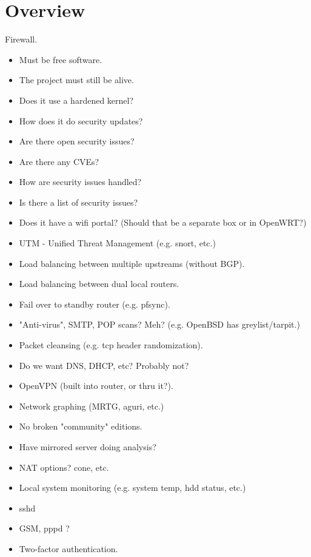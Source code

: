 %
%
%
%
%

\section{Overview}
Firewall.

\begin{itemize}
 \item Must be free software.
 \item The project must still be alive.
 \item Does it use a hardened kernel?
 \item How does it do security updates?
 \item Are there open security issues?
 \item Are there any CVEs?
 \item How are security issues handled?
 \item Is there a list of security issues?
 \item Does it have a wifi portal? (Should that be a separate box or in OpenWRT?)
 \item UTM - Unified Threat Management (e.g. snort, etc.)
 \item Load balancing between multiple upstreams (without BGP).
 \item Load balancing between dual local routers.
 \item Fail over to standby router (e.g. pfsync).
 \item "Anti-virus", SMTP, POP scans? Meh? (e.g. OpenBSD has greylist/tarpit.)
 \item Packet cleansing (e.g. tcp header randomization).
 \item Do we want DNS, DHCP, etc? Probably not?
 \item OpenVPN (built into router, or thru it?).
 \item Network graphing (MRTG, aguri, etc.)
 \item No broken "community" editions.
 \item Have mirrored server doing analysis?
 \item NAT options? cone, etc.
 \item Local system monitoring (e.g. system temp, hdd status, etc.)
 \item sshd
 \item GSM, pppd ?
 \item Two-factor authentication.
\end{itemize}


